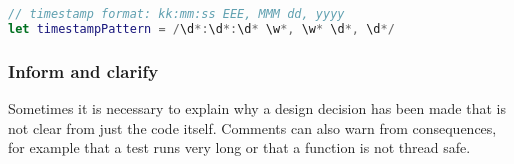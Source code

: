 \begin{lstlisting}[language=Swift, caption={A useful comment describing a regular expression}]
// timestamp format: kk:mm:ss EEE, MMM dd, yyyy
let timestampPattern = /\d*:\d*:\d* \w*, \w* \d*, \d*/
\end{lstlisting}

\subsubsection{Inform and clarify}
Sometimes it is necessary to explain why a design decision has been made that is not clear from just the code itself. Comments can also warn from consequences, for example that a test runs very long or that a function is not thread safe.